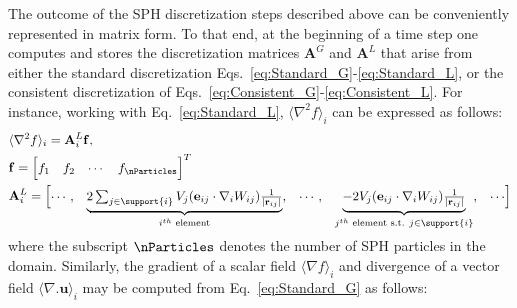 The outcome of the SPH discretization steps described above can be conveniently represented in matrix form. To that end, at the beginning of a time step one computes and stores the discretization matrices $\mathbf{A}^G$ and $\mathbf{A}^L$ that arise from either the standard discretization Eqs.~\ref{eq:Standard_G}-\ref{eq:Standard_L}, or the consistent discretization of  Eqs.~\ref{eq:Consistent_G}-\ref{eq:Consistent_L}. For instance, working with Eq.~\ref{eq:Standard_L}, $\langle \nabla^2 f \rangle_i$ can be expressed as follows:
\begin{align}\renewcommand{\arraystretch}{1.2}
&\langle \nabla^2 f \rangle_i=\mathbf{A}^L_i \mathbf{f},\\
&\mathbf{f}= \begin{bmatrix}
f_1&f_2&\cdots&f_{\nParticles}
\end{bmatrix}^T\\
&\mathbf{A}^L_i= \begin{bmatrix}
\cdots, & 
\smash[b]{\underbrace{\begin{matrix}2\sum_{j \in \support{i}} V_j ( \mathbf{e}_{ij} \cdot \nabla_i W_{ij}) \frac{1}{|\mathbf{r}_{ij}|} \end{matrix}}_{i^{th}\text{ element} }},
&\cdots, &\smash[b]{\underbrace{\begin{matrix}-2 V_j ( \mathbf{e}_{ij} \cdot \nabla_i W_{ij}) \frac{1}{|\mathbf{r}_{ij}|}\end{matrix}}_{j^{th}\text{ element s.t. }{j \in \support{i}} }}, & \cdots
\end{bmatrix}
\end{align}
\\
where the subscript ${\nParticles}$ denotes the number of SPH particles in the domain. Similarly, the gradient of a scalar field $\langle \nabla f \rangle_i$ and divergence of a vector field $\langle \nabla . \mathbf{u} \rangle_i$ may be computed from Eq.~\ref{eq:Standard_G} as follows:
